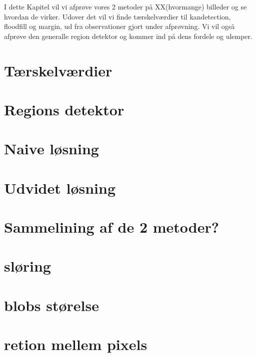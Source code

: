 {
{\sffamily
I dette Kapitel vil vi afprøve vores 2 metoder på XX(hvormange) billeder
og se hvordan de virker. Udover det vil vi finde tærskelværdier til
kandetection, floodfill og margin, ud fra observationer gjort under
afprøvning. Vi vil også afprøve den generalle region detektor og kommer
ind på dens fordele og ulemper. 
}

\section{Tærskelværdier}

\clearpage

\section{Regions detektor}

\clearpage

\section{Naive løsning}

\clearpage

\section{Udvidet løsning}


\section{Sammelining af de 2 metoder?}

\section{sløring}

\section{blobs størelse}

\section{retion mellem pixels}

}

